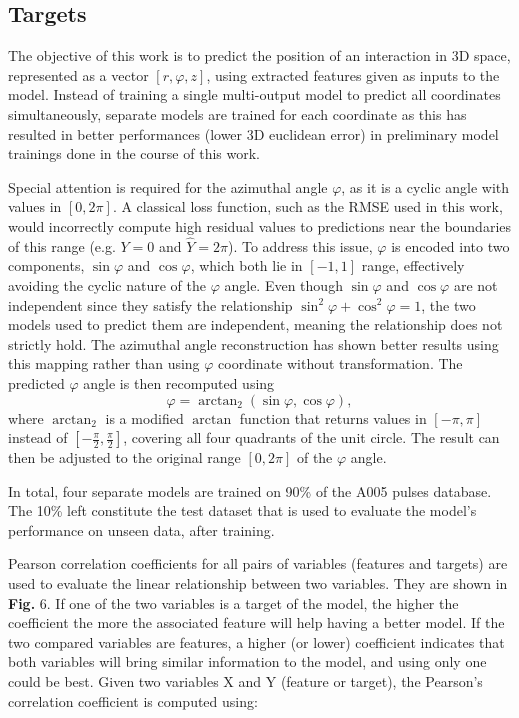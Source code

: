 \subsection{Targets}

The objective of this work is to predict the position of an interaction in 3D space, represented as a vector $[r, \varphi, z]$, using extracted features given as inputs to the model. Instead of training a single multi-output model to predict all coordinates simultaneously, separate models are trained for each coordinate as this has resulted in better performances (lower 3D euclidean error) in preliminary model trainings done in the course of this work.

Special attention is required for the azimuthal angle $\varphi$, as it is a cyclic angle with values in $[0, 2\pi]$. A classical loss function, such as the RMSE used in this work, would incorrectly compute high residual values to predictions near the boundaries of this range (e.g. $Y = 0$ and $\hat Y = 2\pi$).
To address this issue, $\varphi$ is encoded into two components, $\sin \varphi$ and $\cos \varphi$, which both lie in $[-1, 1]$ range, effectively avoiding the cyclic nature of the $\varphi$ angle. Even though $\sin \varphi$ and $\cos \varphi$ are not independent since they satisfy the relationship $\sin^2 \varphi + \cos^2 \varphi = 1$, the two models used to predict them are independent, meaning the relationship does not strictly hold. The azimuthal angle reconstruction has shown better results using this mapping rather than using $\varphi$ coordinate without transformation. The predicted $\varphi$ angle is then recomputed using 
\begin{equation}
\label{eq:atan2}
    \varphi = \operatorname{arctan}_2(\sin \varphi, \cos \varphi),
\end{equation}
where $\operatorname{arctan}_2$ is a modified $\arctan$ function that returns values in $[-\pi, \pi]$ instead of $[-\frac{\pi}{2}, \frac{\pi}{2}]$, covering all four quadrants of the unit circle. The result can then be adjusted to the original range $[0, 2\pi]$ of the $\varphi$ angle.

In total, four separate models are trained on 90\% of the A005 pulses database. The 10\% left constitute the test dataset that is used to evaluate the model's performance on unseen data, after training.

Pearson correlation coefficients for all pairs of variables (features and targets) are used to evaluate the linear relationship between two variables. They are shown in \textbf{Fig.} 6. If one of the two variables is a target of the model, the higher the coefficient the more the associated feature will help having a better model. If the two compared variables are features, a higher (or lower) coefficient indicates that both variables will bring similar information to the model, and using only one could be best. Given two variables X and Y (feature or target), the Pearson's correlation coefficient is computed using:

